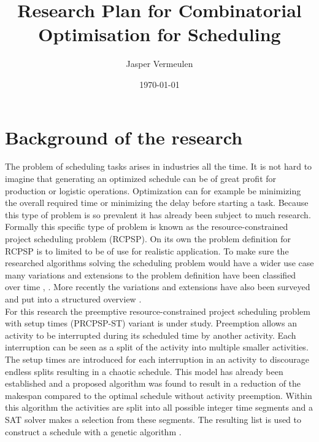 \documentclass[english]{article}
\title{Research Plan for Combinatorial Optimisation for Scheduling}
\author{Jasper Vermeulen}
\date{\today}
\begin{document}
\maketitle

\section*{Background of the research}
The problem of scheduling tasks arises in industries all the time. It is not hard to imagine that generating an optimized schedule can be of great profit for production or logistic operations.
Optimization can for example be minimizing the overall required time or minimizing the delay before starting a task. Because this type of problem is so prevalent it has already been subject to much research.\\
Formally this specific type of problem is known as the resource-constrained project scheduling problem (RCPSP). On its own the problem definition for RCPSP is to limited to be of use for realistic application. To make sure the researched algorithms solving the scheduling problem would have a wider use case many variations and extensions to the problem definition have been classified over time \cite{RN9}, \cite{RN10}. More recently the variations and extensions have also been surveyed and put into a structured overview \cite{RN6}.\\
For this research the preemptive resource-constrained project scheduling problem with setup times (PRCPSP-ST) variant is under study. Preemption allows an activity to be interrupted during its scheduled time by another activity. Each interruption can be seen as a split of the activity into multiple smaller activities. The setup times are introduced for each interruption in an activity to discourage endless splits resulting in a chaotic schedule. This model has already been established \cite{RN13} and a proposed algorithm was found to result in a reduction of the makespan \cite{RN1} compared to the optimal schedule without activity preemption. Within this algorithm the activities are split into all possible integer time segments and a SAT solver makes a selection from these segments. The resulting list is used to construct a schedule with a genetic algorithm \cite{RN14}.\\

\end{document}
